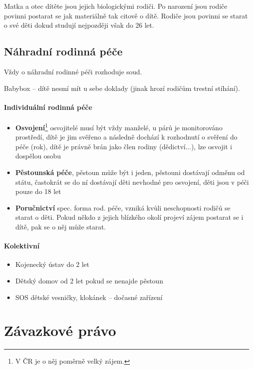 \documentclass[10pt,a4paper,
twoside,%
]{report}
\begin{document}
Matka a otec dítěte jsou jejich biologickými rodiči. Po narození jsou rodiče povinni postarat se jak materiálně tak citově o dítě. Rodiče jsou povinni se starat o své děti dokud studují nejpozději však do 26 let.

\subsection{Náhradní rodinná péče}
Vždy o náhradní rodinné péči rozhoduje soud.

Babybox -- dítě nesmí mít u sebe doklady (jinak hrozí rodičům trestní stíhání).

\paragraph{Individuální rodinná péče}\begin{itemize}

\item \textbf{Osvojení}\footnote{V ČR je o něj poměrně velký zájem.} osvojitelé musí být vždy manželé, u párů je monitorováno prostředí, dítě je jim svěřeno a následně dochází k rozhodnutí o svěření do péče (rok), dítě je právně brán jako člen rodiny (dědictví...), lze osvojit i dospělou osobu
\item \textbf{Pěstounská péče}, pěstoun může být i jeden, pěstouni dostávají odměnu od státu, častokrát se do ní dostávají děti nevhodné pro osvojení, děti jsou v péči pouze do 18 let
\item \textbf{Poručnictví} spec. forma rod. péče, vzniká kvůli neschopnosti rodičů se starat o děti. Pokud někdo z jejich blízkého okolí projeví zájem postarat se i dítě, pak se o něj může starat. 
\end{itemize}

\paragraph{Kolektivní}\begin{itemize}
\item Kojenecký ústav do 2 let 
\item Dětský domov od 2 let pokud se nenajde pěstoun
\item SOS dětské vesničky, klokánek -- dočasné zařízení
\end{itemize}

\section{Závazkové právo}
\end{document}
